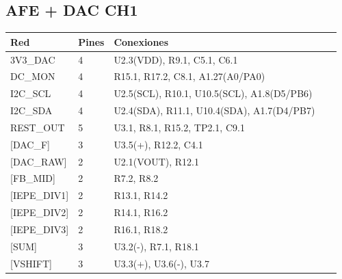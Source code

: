 \documentclass[10pt,a4paper]{article}
\begin{document}
\subsection*{AFE + DAC CH1}
{\footnotesize\begin{longtable}{@{}L{0.2\linewidth}L{0.06\linewidth}L{0.7\linewidth}@{}}\toprule
\textbf{Red} & \textbf{Pines} & \textbf{Conexiones}\\\midrule\endhead
3V3\_\allowbreak{}DAC & 4 & U2.3(VDD), R9.1, C5.1, C6.1\\
DC\_\allowbreak{}MON & 4 & R15.1, R17.2, C8.1, A1.27(A0/PA0)\\
I2C\_\allowbreak{}SCL & 4 & U2.5(SCL), R10.1, U10.5(SCL), A1.8(D5/PB6)\\
I2C\_\allowbreak{}SDA & 4 & U2.4(SDA), R11.1, U10.4(SDA), A1.7(D4/PB7)\\
REST\_\allowbreak{}OUT & 5 & U3.1, R8.1, R15.2, TP2.1, C9.1\\
{[}DAC\_\allowbreak{}F{]} & 3 & U3.5(+), R12.2, C4.1\\
{[}DAC\_\allowbreak{}RAW{]} & 2 & U2.1(VOUT), R12.1\\
{[}FB\_\allowbreak{}MID{]} & 2 & R7.2, R8.2\\
{[}IEPE\_\allowbreak{}DIV1{]} & 2 & R13.1, R14.2\\
{[}IEPE\_\allowbreak{}DIV2{]} & 2 & R14.1, R16.2\\
{[}IEPE\_\allowbreak{}DIV3{]} & 2 & R16.1, R18.2\\
{[}SUM{]} & 3 & U3.2(-), R7.1, R18.1\\
{[}VSHIFT{]} & 3 & U3.3(+), U3.6(-), U3.7\\
\bottomrule\end{longtable}}
\end{document}
